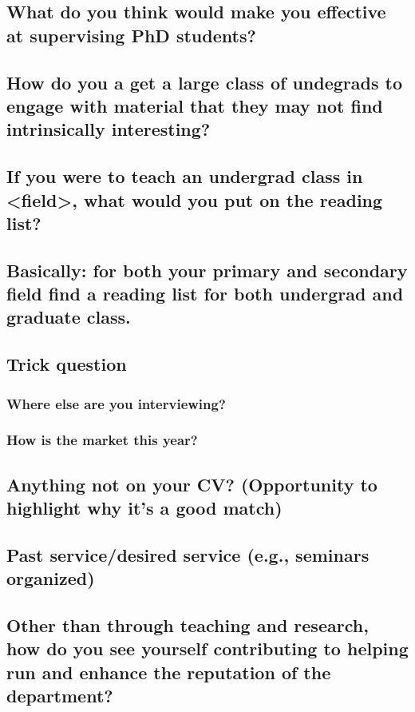 \documentclass[12pt]{article}
\theoremstyle{plain}
\theoremstyle{plain}
\theoremstyle{plain}
\theoremstyle{plain}
\theoremstyle{plain}
\theoremstyle{plain}
\begin{document}
\subsection{What do you think would make you effective at supervising PhD students?}
\label{sec:org1742175}
\subsection{How do you a get a large class of undegrads to engage with material that they may not find intrinsically interesting?}
\label{sec:org15c0adb}
\subsection{If you were to teach an undergrad class in <field>, what would you put on the reading list?}
\label{sec:org6e13694}
\subsection{Basically: for both your primary and secondary field find a reading list for both undergrad and graduate class.}
\label{sec:org62d812a}
\subsection{Trick question}
\label{sec:org85dc3f1}
\subsubsection{Where else are you interviewing?}
\label{sec:org3ecc9fe}
\subsubsection{How is the market this year?}
\label{sec:org2b112f2}
\subsection{Anything not on your CV? (Opportunity to highlight why it's a good match)}
\label{sec:org458389b}
\subsection{Past service/desired service (e.g., seminars organized)}
\label{sec:orgcfe611e}
\subsection{Other than through teaching and research, how do you see yourself contributing to helping run and enhance the reputation of the department?}
\label{sec:org4a36481}
\end{document}
